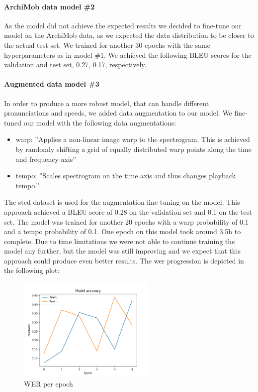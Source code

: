 \paragraph{ArchiMob data model \#2} As the  model did not achieve the expected results we decided to fine-tune our model on the ArchiMob data, as we expected the data distribution to be closer
to the actual test set. We trained for another 30 epochs with the same hyperparameters as in model \#1. We achieved the following BLEU scores for the validation and test set, 0.27, 0.17,
respectively.
\paragraph{Augmented data model \#3} In order to produce a more robust model, that can handle different pronunciations and speeds, we added data augmentation to our  model. We fine-tuned our
model with the following data augmentations:
\begin{itemize}
    \item warp: ''Applies a non-linear image warp to the spectrogram. This is achieved by randomly shifting a grid of equally distributed warp points along the time and frequency axis''
    \cite{DeepSpeechAugmentation}
    \item tempo: ''Scales spectrogram on the time axis and thus changes playback tempo.'' \cite{DeepSpeechAugmentation}
\end{itemize}

The \gls{stcd} dataset is used for the augmentation fine-tuning on the  model. This approach achieved a BLEU score of 0.28 on the validation set and 0.1 on the test set. The model was trained for another
20 epochs with a warp probability of 0.1 and a tempo probability of 0.1. One epoch on this model took around 3.5h to complete. Due to time limitations we
were not able to continue training the model any further, but the model was still improving and we expect that this approach could produce even better results. The \gls{wer} progression is depicted in the following plot:
\begin{figure}[H]
    \includegraphics[width=\linewidth,height=5cm]{img/werPlot.png}
    \caption{WER per epoch}
    \label{fig:werPerEpoch}
\end{figure}

